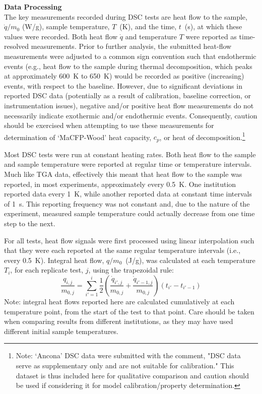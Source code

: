 \documentclass{book}
\begin{document}
\textbf{Data Processing} \\
The key measurements recorded during DSC tests are heat flow to the sample, $\dot{q}/m_0$ (W/g), sample temperature, $T$~(K), and the time, $t$~(s), at which these values were recorded.  Both heat flow $\dot{q}$ and temperature $T$ were reported as time-resolved measurements. Prior to further analysis, the submitted heat-flow measurements were adjusted to a common sign convention such that endothermic events (e.g., heat flow to the sample during thermal decomposition, which peaks at approximately 600~K to 650~K) would be recorded as positive (increasing) events, with respect to the baseline. However, due to significant deviations in reported DSC data (potentially as a result of calibration, baseline correction, or instrumentation issues), negative and/or positive heat flow measurements do not necessarily indicate exothermic and/or endothermic events. Consequently, caution should be exercised when attempting to use these measurements for determination of `MaCFP-Wood' heat capacity, $c_p$, or heat of decomposition.\footnote{Note: `Ancona' DSC data were submitted with the comment, "DSC data serve as supplementary only and are not suitable for calibration." This dataset is thus included here for qualitative comparison and caution should be used if considering it for model calibration/property determination.}

Most DSC tests were run at constant heating rates. Both heat flow to the sample and sample temperature were reported at regular time or temperature intervals. Much like TGA data, effectively this meant that heat flow to the sample was reported, in most experiments, approximately every 0.5~K. One institution reported data every 1~K, while another reported data at constant time intervals of 1~s. This reporting frequency was not constant and, due to the nature of the experiment, measured sample temperature could actually decrease from one time step to the next.

For all tests, heat flow signals were first processed using linear interpolation such that they were each reported at the same regular temperature intervals (i.e., every 0.5~K). Integral heat flow, $q/m_0$~(J/g), was calculated at each temperature $T_i$, for each replicate test, $j$, using the trapezoidal rule:
\begin{equation}
\frac{q_{i,j}}{m_{0,j}} = \sum_{i'=1}^i \frac{1}{2} \left( \frac{\dot{q}_{i',j}}{m_{0,j}} + \frac{\dot{q}_{i'-1,j}}{m_{0,j}} \right) \left(t_{i'}-t_{i'-1} \right)
\end{equation}
Note: integral heat flows reported here are calculated cumulatively at each temperature point, from the start of the test to that point. Care should be taken when comparing results from different institutions, as they may have used different initial sample temperatures.
\end{document}
